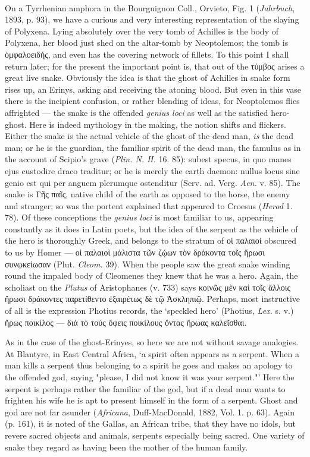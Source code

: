 \documentclass[a4paper, 11pt, oneside, polutonikogreek, english]{article}
\begin{document}
\paragraph{}
On a Tyrrhenian amphora in the Bourguignon Coll., Orvieto, Fig. 1 (\emph{Jahrbuch}, 1893, p. 93), we have a curious and very interesting representation of the slaying of Polyxena. Lying absolutely over the very tomb of Achilles is the body of Polyxena, her blood just shed on the altar-tomb by Neoptolemos; the tomb is ὀμφαλοειδής, and even has the covering network of fillets. To this point I shall return later; for the present the important point is, that out of the τύμβος arises a great live snake. Obviously the idea is that the ghost of Achilles in snake form rises up, an Erinys, asking and receiving the atoning blood. But even in this vase there is the incipient confusion, or rather blending of ideas, for Neoptolemos flies affrighted --- the snake is the offended \emph{genius loci} as well as the satisfied hero-ghost. Here is indeed mythology in the making, the notion shifts and flickers. Either the snake is the actual vehicle of the ghost of the dead man, \emph{is} the dead man; or he is the guardian, the familiar spirit of the dead man, the famulus as in the account of Scipio's grave (\emph{Plin. N. H.} 16. 85): subest specus, in quo manes ejus custodire draco traditur; or he is merely the earth daemon: nullus locus sine genio est qui per anguem plerumque ostenditur (Serv. ad. Verg. \emph{Aen.} v. 85). The snake is Γῆς παῖς, native child of the earth as opposed to the horse, the enemy and stranger; so was the portent explained that appeared to Croesus (\emph{Herod} 1. 78). Of these conceptions the \emph{genius loci} is most familiar to us, appearing constantly as it does in Latin poets, but the idea of the serpent as the vehicle of the hero is thoroughly Greek, and belongs to the stratum of οἱ παλαιοί obscured to us by Homer --- οἱ παλαιοὶ μάλιστα τῶν ζῴων τὸν δράκοντα τοῖς ἥρωσι συνῳκείωσαν (Plut. \emph{Cleom.} 39). When the people saw the great snake winding round the impaled body of Cleomenes they knew that he was a hero. Again, the scholiast on the \emph{Plutus} of Aristophanes (v. 733) says κοινῶς μὲν καὶ τοῖς ἄλλοις ἥρωσι δράκοντες παρετίθεντο ἐξαιρέτως δὲ τῷ Ἀσκληπιῷ. Perhaps, most instructive of all is the expression Photius records, the `speckled hero' (Photius, \emph{Lex.} s. v.) ἥρως ποικίλος --- διὰ τὸ τοὺς ὄφεις ποικίλους ὄντας ἥρωας καλεῖσθαι.

As in the case of the ghost-Erinyes, so here we are not without savage analogies. At Blantyre, in East Central Africa, `a spirit often appears as a serpent. When a man kills a serpent thus belonging to a spirit he goes and makes an apology to the offended god, saying "please, I did not know it was your serpent."' Here the serpent is perhaps rather the familiar of the god, but if a dead man wants to frighten his wife he is apt to present himself in the form of a serpent. Ghost and god are not far asunder (\emph{Africana}, Duff-MacDonald, 1882, Vol. 1. p. 63). Again (p. 161), it is noted of the Gallas, an African tribe, that they have no idols, but revere sacred objects and animals, serpents especially being sacred. One variety of snake they regard as having been the mother of the human family.
\end{document}
